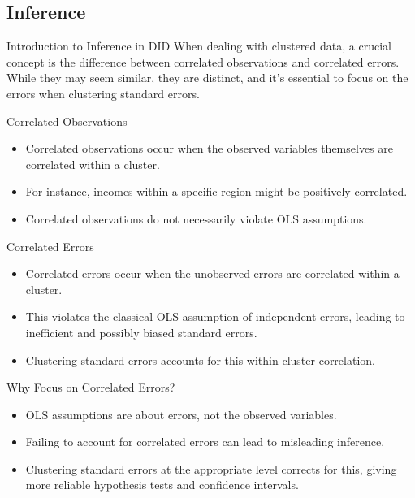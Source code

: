 \documentclass{beamer}
\begin{document}
\subsection{Inference}

\begin{frame}{Introduction to Inference in DID}
  When dealing with clustered data, a crucial concept is the difference between correlated observations and correlated errors. While they may seem similar, they are distinct, and it's essential to focus on the errors when clustering standard errors.
\end{frame}

\begin{frame}{Correlated Observations}
  \begin{itemize}
    \item Correlated observations occur when the observed variables themselves are correlated within a cluster.
    \item For instance, incomes within a specific region might be positively correlated.
    \item Correlated observations do not necessarily violate OLS assumptions.
  \end{itemize}
\end{frame}

\begin{frame}{Correlated Errors}
  \begin{itemize}
    \item Correlated errors occur when the unobserved errors are correlated within a cluster.
    \item This violates the classical OLS assumption of independent errors, leading to inefficient and possibly biased standard errors.
    \item Clustering standard errors accounts for this within-cluster correlation.
  \end{itemize}
\end{frame}

\begin{frame}{Why Focus on Correlated Errors?}
  \begin{itemize}
    \item OLS assumptions are about errors, not the observed variables.
    \item Failing to account for correlated errors can lead to misleading inference.
    \item Clustering standard errors at the appropriate level corrects for this, giving more reliable hypothesis tests and confidence intervals.
  \end{itemize}
\end{frame}
\end{document}
